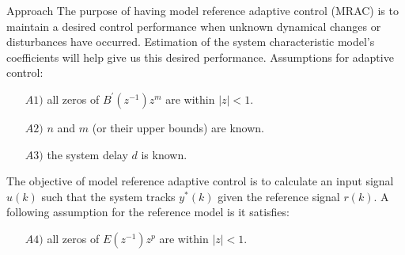 \begin{section}{Approach}
The purpose of having model reference adaptive control (MRAC) is to maintain a desired control performance when unknown dynamical changes or disturbances have occurred. Estimation of the system characteristic model's coefficients will help give us this desired performance.
Assumptions for adaptive control: 
	\begin{enumerate}[leftmargin=4\parindent]
	\item[$A1)$] all zeros of $B^{'}(z^{-1})z^m$ are within $|z|<1$. 
	\item[$A2)$] $n$ and $m$ (or their upper bounds) are known. 
	\item[$A3)$] the system delay $d$ is known.
	\end{enumerate}
The objective of model reference adaptive control is to calculate an input signal $u(k)$ such that the system tracks $y^{*}(k)$ given the reference signal $r(k)$. 
A following assumption for the reference model is it satisfies:
    \begin{enumerate}[leftmargin=4\parindent]
	\item[$A4)$] all zeros of $E(z^{-1})z^p$ are within $|z|<1$. 
	\end{enumerate}


\end{section}
